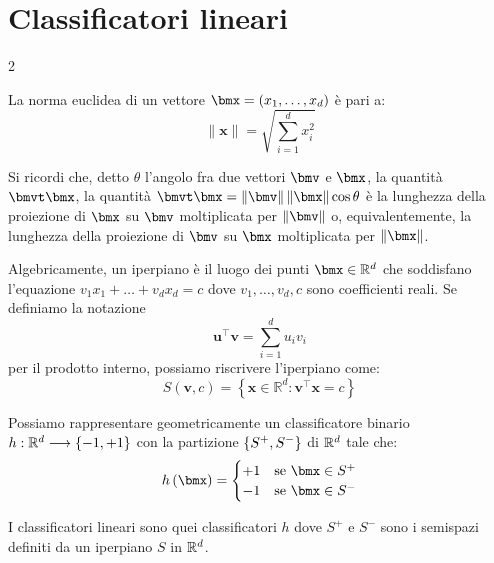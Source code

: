\documentclass[\main/main.tex]{subfiles}
\begin{document}
\chapter{Classificatori lineari}
\begin{multicols}{2}
\begin{definition}
    La norma euclidea di un vettore \(\bmx = \rnd{x_1, \ldots, x_d}\) è pari a:
    \[
        \|\boldsymbol{x}\|=\sqrt{\sum_{i=1}^{d} x_{i}^{2}}
    \]
\end{definition}
\begin{definition}
    Si ricordi che, detto \(\theta\) l'angolo fra due vettori \(\bmv\) e \(\bmx\), la quantità \(\bmvt\bmx\), la quantità \(\bmvt\bmx = \norm{\bmv}\norm{\bmx}\cos\theta\) è la lunghezza della proiezione di \(\bmx\) su \(\bmv\) moltiplicata per \(\norm{\bmv}\) o, equivalentemente, la lunghezza della proiezione di \(\bmv\) su \(\bmx\) moltiplicata per \(\norm{\bmx}\).
\end{definition}
\begin{definition}[Iperpiano]
    Algebricamente, un iperpiano è il luogo dei punti \(\bmx \in \R^d\) che soddisfano l'equazione \(v_1x_1 + \ldots + v_dx_d = c\) dove \(v_1, \ldots, v_d, c\) sono coefficienti reali. Se definiamo la notazione
    \[
        \boldsymbol{u}^{\top} \boldsymbol{v}=\sum_{i=1}^{d} u_{i} v_{i}
    \]
    per il prodotto interno, possiamo riscrivere l'iperpiano come:
    \[
        S(\boldsymbol{v}, c)=\left\{\boldsymbol{x} \in \mathbb{R}^{d} : \boldsymbol{v}^{\top} \boldsymbol{x}=c\right\}
    \]
\end{definition}
\begin{observation}
    Possiamo rappresentare geometricamente un classificatore binario \(h:\mathbb{R}^d\longrightarrow \left\{-1, +1\right\}\) con la partizione \(\left\{S^+, S^-\right\}\) di \(\mathbb{R}^d\) tale che:
    \[
        h\rnd{\bmx} = \begin{cases}
            +1 & \text{se }\bmx \in S^+\\
            -1 & \text{se }\bmx \in S^-
        \end{cases}
    \]
\end{observation}
\begin{definition}
    I classificatori lineari sono quei classificatori \(h\) dove \(S^+\) e \(S^-\) sono i semispazi definiti da un iperpiano \(S\) in \(\mathbb{R}^d\).
\end{definition}
\begin{property}

\end{property}
\end{multicols}
\end{document}
